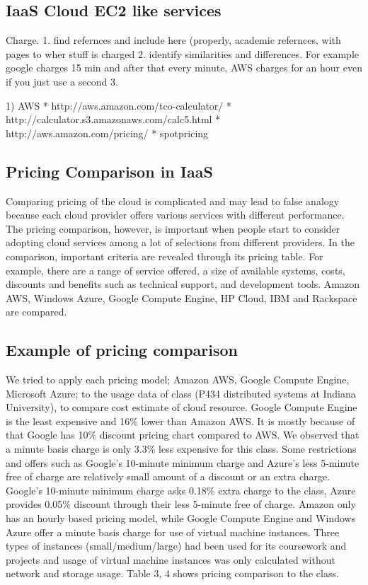 \documentclass{sig-alternate}
\begin{document}
\subsection{IaaS Cloud EC2 like services}
Charge. 
1.	find refernces and include here (properly, academic refernces, with pages to wher stuff is charged
2.	identify similarities and differences. For example google charges 15 min and after that every minute, AWS charges for an hour even if you just use a second
3.	

1)	AWS
*	http://aws.amazon.com/tco-calculator/
*	http://calculator.s3.amazonaws.com/calc5.html
*	http://aws.amazon.com/pricing/
*	spotpricing



\subsection{Pricing Comparison in IaaS}

Comparing pricing of the cloud is complicated and may lead to false analogy because each cloud provider offers various services with different performance. The pricing comparison, however, is important when people start to consider adopting cloud services among a lot of selections from different providers. In the comparison, important criteria are revealed through its pricing table. For example, there are a range of service offered, a size of available systems, costs, discounts and benefits such as technical support, and development tools. Amazon AWS, Windows Azure, Google Compute Engine, HP Cloud, IBM and Rackspace are compared.

 

 

 

\subsection{Example of pricing comparison}

We tried to apply each pricing model; Amazon AWS, Google Compute Engine, Microsoft Azure; to the usage data of class (P434 distributed systems at Indiana University), to compare cost estimate of cloud resource. Google Compute Engine is the least expensive and 16\% lower than Amazon AWS. It is mostly because of that Google has 10\% discount pricing chart compared to AWS. We observed that a minute basis charge is only 3.3\% less expensive for this class. Some restrictions and offers such as Google’s 10-minute minimum charge and Azure’s less 5-minute free of charge are relatively small amount of a discount or an extra charge. Google’s 10-minute minimum charge asks 0.18\% extra charge to the class, Azure provides 0.05\% discount through their less 5-minute free of charge. Amazon only has an hourly based pricing model, while Google Compute Engine and Windows Azure offer a minute basis charge for use of virtual machine instances. Three types of instances (small/medium/large) had been used for its coursework and projects and usage of virtual machine instances was only calculated without network and storage usage. Table 3, 4 shows pricing comparison to the class.
\end{document}
